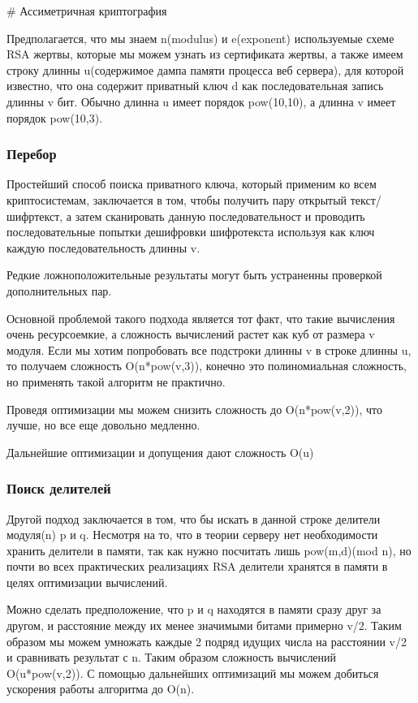 \documentclass[20pt]{article}
\begin{document}
\# Ассиметричная криптография

Предполагается, что мы знаем n(modulus) и e(exponent) используемые схеме RSA жертвы, которые мы можем узнать из сертификата жертвы, а также
имеем строку длинны u(содержимое дампа памяти процесса веб сервера), для которой известно, что она содержит приватный ключ d как последовательная запись длинны v бит. Обычно длинна u имеет порядок pow(10,10), а длинна v имеет порядок pow(10,3).

\subsubsection{Перебор}

Простейший способ поиска приватного ключа, который применим ко всем криптосистемам, заключается в том, чтобы получить пару открытый текст/шифртекст, а затем сканировать данную последовательност и проводить последовательные попытки дешифровки шифротекста используя как ключ каждую последовательность длинны v.

Редкие ложноположительные результаты могут быть устраненны проверкой дополнительных пар.

Основной проблемой такого подхода является тот факт, что такие вычисления очень ресурсоемкие, а сложность вычислений растет как куб от размера v модуля. Если мы хотим попробовать все подстроки длинны v в строке длинны u, то получаем сложность O(n*pow(v,3)), конечно это полиномиальная сложность, но применять такой алгоритм не практично.

Проведя оптимизации мы можем снизить сложность до O(n*pow(v,2)), что лучше, но все еще довольно медленно.

Дальнейшие оптимизации и допущения дают сложность O(u)

\subsubsection{Поиск делителей}

Другой подход заключается в том, что бы искать в данной строке делители модуля(n) p и q. Несмотря на то, что в теории серверу нет необходимости хранить делители в памяти, так как нужно посчитать лишь pow(m,d)(mod n), но почти во всех практических реализациях RSA делители хранятся в памяти в целях оптимизации вычислений.

Можно сделать предположение, что p и q находятся в памяти сразу друг за другом, и расстояние между их менее значимыми битами примерно v/2. Таким образом мы можем умножать каждые 2 подряд идущих числа на расстоянии v/2 и сравнивать результат с n. Таким образом сложность вычислений O(u*pow(v,2)). С помощью дальнейших оптимизаций мы можем добиться ускорения работы алгоритма до O(n).
\end{document}
